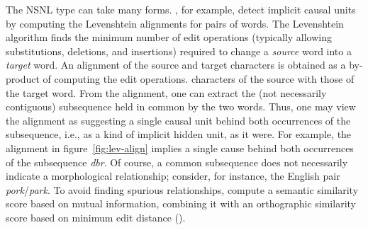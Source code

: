 The NSNL type can take many forms. 
\cite{baroni-et-al:2002}, for example, detect implicit causal units by computing 
the Levenshtein alignments for pairs of words. 
The Levenshtein algorithm finds the minimum number of edit operations 
(typically allowing substitutions, deletions, and insertions) required to change 
a \textit{source} word into a \textit{target} word.
An alignment of the source and target characters is obtained as a by-product 
of computing the edit operations.
characters of the source with those of the target word. 
From the alignment, one can extract the (not necessarily contiguous) 
subsequence held in common by the two words.
Thus, one may view the alignment as suggesting a single causal unit behind 
both occurrences of the subsequence, i.e., as a kind of implicit hidden unit, 
as it were.
For example, the alignment in figure~\ref{fig:lev-align} implies a single cause 
behind both occurrences of the subsequence \textit{dbr}.
Of course, a common subsequence does not necessarily indicate a 
morphological relationship; 
consider, for instance, the English pair \textit{pork}/\textit{park}. 
To avoid finding spurious relationships, 
\cite{baroni-et-al:2002} compute a semantic similarity score based on 
mutual information, 
combining it with an orthographic similarity score based on minimum 
edit distance ().

